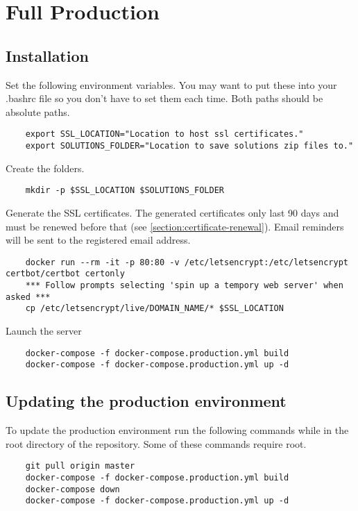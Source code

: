\section{Full Production}

\subsection{Installation}

Set the following environment variables.  You may want to put these into your .bashrc file so you don't have to set them each time.  Both paths should be absolute paths.

\begin{verbatim}
	export SSL_LOCATION="Location to host ssl certificates."
	export SOLUTIONS_FOLDER="Location to save solutions zip files to."
\end{verbatim}

Create the folders.

\begin{verbatim}
	mkdir -p $SSL_LOCATION $SOLUTIONS_FOLDER
\end{verbatim}

Generate the SSL certificates.  The generated certificates only last 90 days and must be renewed before that (see \ref{section:certificate-renewal}).  Email reminders will be sent to the registered email address.

\begin{verbatim}
	docker run --rm -it -p 80:80 -v /etc/letsencrypt:/etc/letsencrypt certbot/certbot certonly
	*** Follow prompts selecting 'spin up a tempory web server' when asked ***
	cp /etc/letsencrypt/live/DOMAIN_NAME/* $SSL_LOCATION
\end{verbatim}

Launch the server

\begin{verbatim}
	docker-compose -f docker-compose.production.yml build
	docker-compose -f docker-compose.production.yml up -d
\end{verbatim}

\subsection{Updating the production environment}

To update the production environment run the following commands while in the root directory of the repository.  Some of these commands require root.

\begin{verbatim}
	git pull origin master
	docker-compose -f docker-compose.production.yml build
	docker-compose down
	docker-compose -f docker-compose.production.yml up -d
\end{verbatim}

